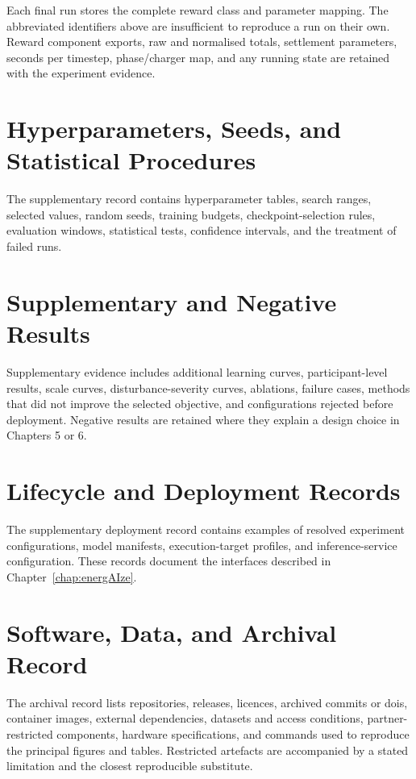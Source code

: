 Each final run stores the complete reward class and parameter mapping. The abbreviated identifiers above are insufficient to reproduce a run on their own. Reward component exports, raw and normalised totals, settlement parameters, seconds per timestep, phase/charger map, and any running state are retained with the experiment evidence.

\section{Hyperparameters, Seeds, and Statistical Procedures}

The supplementary record contains hyperparameter tables, search ranges, selected values, random seeds, training budgets, checkpoint-selection rules, evaluation windows, statistical tests, confidence intervals, and the treatment of failed runs.

\section{Supplementary and Negative Results}

Supplementary evidence includes additional learning curves, participant-level results, scale curves, disturbance-severity curves, ablations, failure cases, methods that did not improve the selected objective, and configurations rejected before deployment. Negative results are retained where they explain a design choice in Chapters 5 or 6.

\section{Lifecycle and Deployment Records}
\label{app:lifecycle-deployment-records}

The supplementary deployment record contains examples of resolved experiment configurations, model manifests, execution-target profiles, and inference-service configuration. These records document the interfaces described in Chapter~\ref{chap:energAIze}.

\section{Software, Data, and Archival Record}

The archival record lists repositories, releases, licences, archived commits or \glspl{doi}, container images, external dependencies, datasets and access conditions, partner-restricted components, hardware specifications, and commands used to reproduce the principal figures and tables. Restricted artefacts are accompanied by a stated limitation and the closest reproducible substitute.


